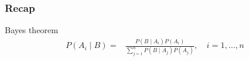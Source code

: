 \documentclass[slidestop,compress,mathserif]{beamer}
\begin{document}

\begin{frame}\frametitle{Recap}

Bayes theorem
\begin{align*}
P(A_i \mid B) = & \frac{P(B \mid A_i)P(A_i)}{\sum\limits_{j = 1}^n P(B \mid A_j)P(A_j)},
\quad i = 1, \ldots, n
\end{align*}
%
%


\end{frame}

\end{document}
